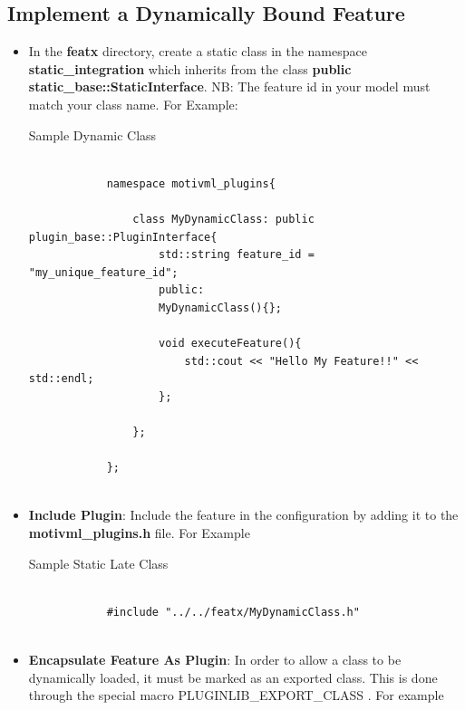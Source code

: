 \documentclass{article}
\newenvironment{longlisting}{\captionsetup{type=listing}}{}
\begin{document}
\subsection{Implement a Dynamically Bound Feature}
\begin{itemize}
	\item In the \textbf{featx} directory, create a static class in the namespace \textbf{static\_integration} which inherits from the class \textbf{public static\_base::StaticInterface}. NB: The feature id in your model must match your class name. For Example:
	
	\begin{longlisting}
		\caption{Sample Dynamic Class}
		\begin{verbatim}
			
			namespace motivml_plugins{
				
				class MyDynamicClass: public plugin_base::PluginInterface{
					std::string feature_id = "my_unique_feature_id";
					public:
					MyDynamicClass(){};
					
					void executeFeature(){
						std::cout << "Hello My Feature!!" << std::endl;
					};
					
				};
				
			};
			
		\end{verbatim}
		\label{samplestaticlate}
	\end{longlisting}

	\item \textbf{Include Plugin}: Include the feature in the configuration by adding it to the \textbf{motivml\_plugins.h} file. For Example
	
	\begin{longlisting}
		\caption{Sample Static Late Class}
		\begin{verbatim}
			
			#include "../../featx/MyDynamicClass.h"
			
		\end{verbatim}
		\label{samplestaticlateinclude}
	\end{longlisting}

	\item \textbf{Encapsulate Feature As Plugin}: In order to allow a class to be dynamically loaded, it must be marked as an exported class. This is done through the special macro PLUGINLIB\_EXPORT\_CLASS  \cite{pluginlib}. For example
	

\end{itemize}
\end{document}
